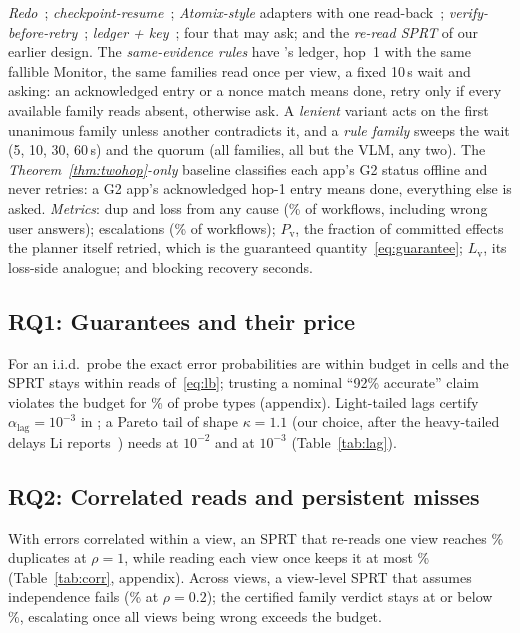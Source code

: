  \emph{Redo}~\cite{tian2025agentprog}; \emph{checkpoint-resume}~\cite{langgraph_durable,khan2026resume}; \emph{Atomix-style} adapters with one
read-back~\cite{mohammadi2026atomix}; \emph{verify-before-retry}~\cite{mansoor2026verified}; \emph{ledger + key}~\cite{li2026exactlyonce}; four that may ask; and the \emph{re-read
SPRT} of our earlier design. The \emph{same-evidence rules} have \sys's ledger, hop~1 with the same fallible Monitor, the same families read once per view, a fixed 10\,s wait and
asking: an acknowledged entry or a nonce match means done, retry only if every available family reads absent, otherwise ask. A \emph{lenient} variant acts on the first
unanimous family unless another contradicts it, and a \emph{rule family} sweeps the wait (5, 10, 30, 60\,s) and the quorum (all families, all but the VLM, any two). The
\emph{Theorem~\ref{thm:twohop}-only} baseline classifies each app's G2 status offline and never retries: a G2 app's acknowledged hop-1 entry means done, everything else is asked.
\emph{Metrics}: dup and loss from any cause (\% of workflows, including wrong user answers); escalations (\% of workflows); $P_{\mathrm{v}}$, the fraction of committed effects the planner
itself retried, which is the guaranteed quantity~\eqref{eq:guarantee}; $L_{\mathrm{v}}$, its loss-side analogue; and blocking recovery seconds.

\subsection{RQ1: Guarantees and their price}
\label{sec:eval-guar}
For an i.i.d.\ probe the exact error probabilities are within budget in \SprtAllWithin \SprtCells cells and the SPRT stays within \SprtGapMax reads of~\eqref{eq:lb};
trusting a nominal ``92\% accurate'' claim violates the budget for \CalNomViol\% of probe types (appendix). Light-tailed lags certify $\alpha_{\mathrm{lag}}{=}10^{-3}$ in
\LagLogThree; a Pareto tail of shape $\kappa{=}1.1$ (our choice, after the heavy-tailed delays Li reports~\cite{li2026exactlyonce}) needs \LagParetoTwo{} at $10^{-2}$ and
\LagParetoThree{} at $10^{-3}$ (Table~\ref{tab:lag}).

\subsection{RQ2: Correlated reads and persistent misses}
\label{sec:eval-robust}
With errors correlated within a view, an SPRT that re-reads one view reaches \CorrNaiveOne\% duplicates at $\rho{=}1$, while reading each view once keeps it at most
\CorrViewWithinMax\% (Table~\ref{tab:corr}, appendix). Across views, a view-level SPRT that assumes independence fails (\CorrViewCrossTwo\% at $\rho{=}0.2$); the certified
family verdict stays at or below \CorrCertMaxHi\%, escalating once all views being wrong exceeds the budget.


